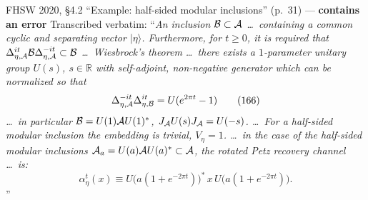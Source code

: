 \documentclass[11pt]{article}
\renewcommand{\cB}{\mathcal B}
\begin{document}
\begin{citedbox}{FHSW 2020, \S4.2 ``Example: half-sided modular inclusions'' (p.~31) --- \textbf{contains an error}}
Transcribed verbatim: ``\emph{An inclusion $\cB\subset\cA$ \dots\ containing a
common cyclic and separating vector $|\eta\rangle$. Furthermore, for $t\ge0$, it
is required that $\Delta^{it}_{\eta,\cA}\cB\Delta^{-it}_{\eta,\cA}\subset\cB$
\dots\ Wiesbrock's theorem \dots\ there exists a $1$-parameter unitary group
$U(s)$, $s\in\mathbb R$ with self-adjoint, non-negative generator which can be
normalized so that}
\[
 \Delta^{-it}_{\eta,\cA}\Delta^{it}_{\eta,\cB}=U(e^{2\pi t}-1)\tag{166}
\]
\emph{\dots\ in particular $\cB=U(1)\cA U(1)^*$, $J_\mathcal A U(s)J_\mathcal A=U(-s)$.
\dots\ For a half-sided modular inclusion the embedding is trivial,
$V_\eta=1$. \dots\ in the case of the half-sided modular inclusions
$\mathcal A_a=U(a)\mathcal A U(a)^*\subset\mathcal A$, the rotated Petz recovery channel \dots\ is:}
\[
 \alpha^t_\eta(x)\equiv U\bigl(a(1+e^{-2\pi t})\bigr)^*\,x\,U\bigl(a(1+e^{-2\pi t})\bigr).\tag{167}
\]''\\[2pt]
\end{citedbox}
\end{document}

